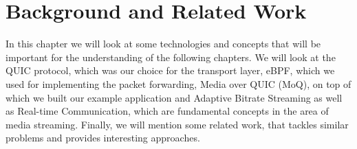 
\chapter{Background and Related Work}\label{chap:background}

In this chapter we will look at some technologies and concepts 
that will be important for the understanding of the following chapters.
We will look at the QUIC protocol, which was our choice for the 
transport layer, eBPF, which we used for implementing the packet 
forwarding, Media over QUIC (MoQ), on top of which we built 
our example application and Adaptive Bitrate Streaming as well as 
Real-time Communication, which are fundamental concepts in the area 
of media streaming.
Finally, we will mention some related work, that tackles similar 
problems and provides interesting approaches.  






